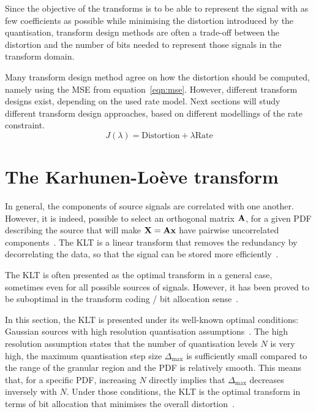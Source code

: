 \documentclass[11pt,a4paper,openright,twoside]{book}
\numberwithin{equation}{section} %
\begin{document}
Since the objective of the transforms is to be able to represent the
signal with as few coefficients as possible while minimising the
distortion introduced by the quantisation, transform design methods are
often a trade-off between the distortion and the number of bits needed
to represent those signals in the transform domain.

Many transform design method agree on how the distortion should be
computed, namely using the \ac{MSE} from equation~\ref{eqn:mse}.
However, different transform designs exist, depending on the used rate
model.
Next sections will study different transform design approaches, based on
different modellings of the rate constraint.
\begin{equation}
	J(\lambda) = \text{Distortion} + \lambda \text{Rate}
	\label{eqn:transform_design}
\end{equation}

\section{The Karhunen-Loève transform}
\label{sec:the_karhunen_loeve_transform}
In general, the components of source signals are correlated with one
another.
However, it is indeed, possible to select an orthogonal matrix $\mathbf{A}$, for
a given \ac{PDF} describing the source that will make $\mathbf{X}=\mathbf{A}\mathbf{x}$ have
pairwise uncorrelated components~\cite{gersho-92-vector-quantization}.
The \ac{KLT} is a linear transform that removes the redundancy by
decorrelating the data, so that the signal can be stored more
efficiently~\cite{rao-01-transform-data-compression-book}.

The \ac{KLT} is often presented as the optimal transform in a general
case, sometimes even for all possible sources of signals.
However, it has been proved to be suboptimal in the transform coding /
bit allocation sense~\cite{effros-04-suboptimal-klt}.

In this section, the \ac{KLT} is presented under its well-known optimal
conditions: Gaussian sources with high resolution quantisation
assumptions~\cite{goyal-00-high-resolution}.
The high resolution assumption states that the number of quantisation
levels $N$ is very high, the maximum quantisation step size
$\Delta_{\max}$ is sufficiently small compared to the range of the
granular region and the \ac{PDF} is relatively smooth.
This means that, for a specific \ac{PDF}, increasing $N$ directly
implies that $\Delta_{\max}$ decreases inversely with $N$.
Under those conditions, the \ac{KLT} is the optimal transform in terms
of bit allocation that minimises the overall
distortion~\cite{gersho-92-vector-quantization}.
\end{document}

